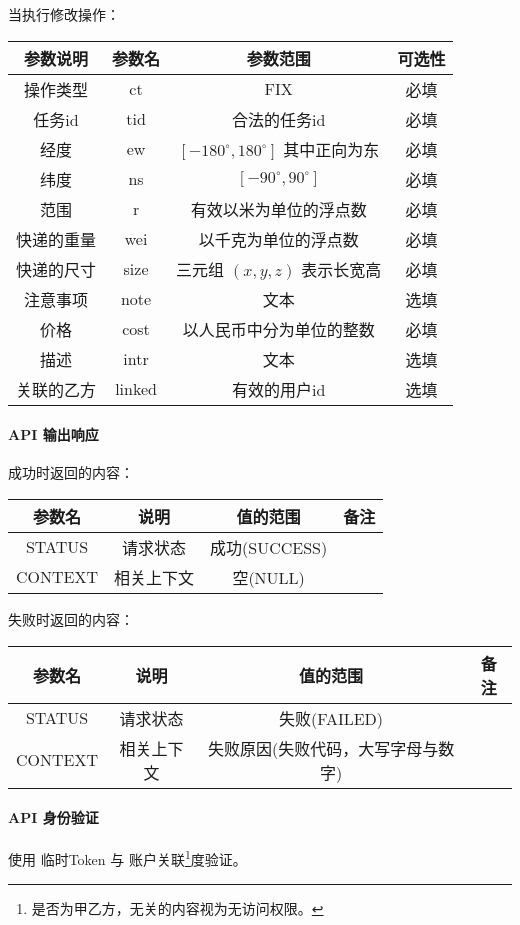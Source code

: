 \documentclass[UTF8]{dingo}
\def\apiresp{\paragraph{\colorbox[rgb]{0.9,0.9,1}{API 输出响应}}} %
\def\apiauth{\paragraph{\colorbox[rgb]{0.45,0.9,1}{API 身份验证}}} %
\def\失败{\colorbox[rgb]{1,0.5,0.5}{失败}}
\def\成功{\colorbox[rgb]{0.4,1,0.5}{成功}}
\def\成功V{成功(SUCCESS)}
\def\失败V{失败(FAILED)}
\def\失败原因{失败原因(失败代码，大写字母与数字)}
\def\空{空(NULL)}
\begin{document}
    \par 当执行修改操作： \\
    \begin{tabular}{|c|c|c|c|}
        \hline \rule[-2ex]{0pt}{5.5ex} 参数说明 & 参数名 & 参数范围 & 可选性 \\
        \hline \rule[-2ex]{0pt}{5.5ex} 操作类型 & ct & FIX & 必填 \\
        \hline \rule[-2ex]{0pt}{5.5ex} 任务id & tid & 合法的任务id & 必填 \\
        \hline \rule[-2ex]{0pt}{5.5ex} 经度 & ew & $[-180^\circ,180^\circ]$ 其中正向为东 & 必填 \\
        \hline \rule[-2ex]{0pt}{5.5ex} 纬度 & ns & $[-90^\circ,90^\circ]$ & 必填 \\
        \hline \rule[-2ex]{0pt}{5.5ex} 范围 & r & 有效以米为单位的浮点数 & 必填 \\
        \hline \rule[-2ex]{0pt}{5.5ex} 快递的重量 & wei & 以千克为单位的浮点数 & 必填 \\
        \hline \rule[-2ex]{0pt}{5.5ex} 快递的尺寸 & size & 三元组 $(x,y,z)$ 表示长宽高 & 必填 \\
        \hline \rule[-2ex]{0pt}{5.5ex} 注意事项 & note & 文本 & 选填 \\
        \hline \rule[-2ex]{0pt}{5.5ex} 价格 & cost & 以人民币中分为单位的整数 & 必填 \\
        \hline \rule[-2ex]{0pt}{5.5ex} 描述 & intr & 文本 & 选填 \\
        \hline \rule[-2ex]{0pt}{5.5ex} 关联的乙方 & linked & 有效的用户id & 选填 \\
        \hline
    \end{tabular}
    \apiresp
    \成功 时返回的内容：\\
    \begin{tabular}{|c|c|c|c|}
        \hline \rule[-2ex]{0pt}{5.5ex} 参数名 & 说明 & 值的范围 & 备注 \\
        \hline \rule[-2ex]{0pt}{5.5ex} STATUS & 请求状态 & \成功V &  \\
        \hline \rule[-2ex]{0pt}{5.5ex} CONTEXT & 相关上下文 & \空 &  \\
        \hline
    \end{tabular}
    \par \失败 时返回的内容：\\
    \begin{tabular}{|c|c|c|c|}
        \hline \rule[-2ex]{0pt}{5.5ex} 参数名 & 说明 & 值的范围 & 备注 \\
        \hline \rule[-2ex]{0pt}{5.5ex} STATUS & 请求状态 & \失败V &  \\
        \hline \rule[-2ex]{0pt}{5.5ex} CONTEXT & 相关上下文 & \失败原因 &  \\
        \hline
    \end{tabular}
    \apiauth
    使用 临时Token 与 账户关联\footnote{是否为甲乙方，无关的内容视为无访问权限。}度验证。
\end{document}
